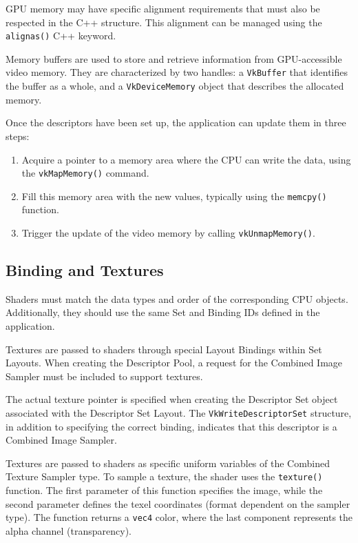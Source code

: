 GPU memory may have specific alignment requirements that must also be respected in the C++ structure. 
This alignment can be managed using the \texttt{alignas()} C++ keyword.

Memory buffers are used to store and retrieve information from GPU-accessible video memory. 
They are characterized by two handles: a \texttt{VkBuffer} that identifies the buffer as a whole, and a \texttt{VkDeviceMemory} object that describes the allocated memory.

Once the descriptors have been set up, the application can update them in three steps:
\begin{enumerate}
    \item Acquire a pointer to a memory area where the CPU can write the data, using the \texttt{vkMapMemory()} command.
    \item Fill this memory area with the new values, typically using the \texttt{memcpy()} function.
    \item Trigger the update of the video memory by calling \texttt{vkUnmapMemory()}.
\end{enumerate}

\subsection{Binding and Textures}
Shaders must match the data types and order of the corresponding CPU objects. 
Additionally, they should use the same Set and Binding IDs defined in the application.

Textures are passed to shaders through special Layout Bindings within Set Layouts. 
When creating the Descriptor Pool, a request for the Combined Image Sampler must be included to support textures.

The actual texture pointer is specified when creating the Descriptor Set object associated with the Descriptor Set Layout. 
The \texttt{VkWriteDescriptorSet} structure, in addition to specifying the correct binding, indicates that this descriptor is a Combined Image Sampler.

Textures are passed to shaders as specific uniform variables of the Combined Texture Sampler type. 
To sample a texture, the shader uses the \texttt{texture()} function. 
The first parameter of this function specifies the image, while the second parameter defines the texel coordinates (format dependent on the sampler type). 
The function returns a \texttt{vec4} color, where the last component represents the alpha channel (transparency).

